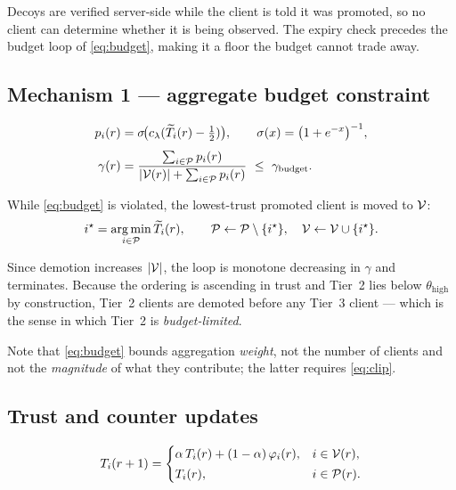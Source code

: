 Decoys are verified server-side while the client is told it was promoted, so no
client can determine whether it is being observed. The expiry check precedes
the budget loop of \eqref{eq:budget}, making it a floor the budget cannot trade
away.

\subsection{Mechanism 1 --- aggregate budget constraint}

\begin{align}
p_i(r) &= \sigma\!\bigl(c_\lambda (\widetilde{T}_i(r) - \tfrac{1}{2})\bigr),
\qquad \sigma(x)=\bigl(1+e^{-x}\bigr)^{-1},
\label{eq:posterior}\\[4pt]
\gamma(r) &= \frac{\sum_{i \in \mathcal{P}} p_i(r)}
                       {\lvert \mathcal{V}(r)\rvert + \sum_{i \in \mathcal{P}} p_i(r)}
\ \le\ \gamma_{\mathrm{budget}}.
\label{eq:budget}
\end{align}

While \eqref{eq:budget} is violated, the lowest-trust promoted client is moved
to $\mathcal{V}$:
\begin{equation}
i^\star = \operatorname*{arg\,min}_{i \in \mathcal{P}} \widetilde{T}_i(r),
\qquad
\mathcal{P} \leftarrow \mathcal{P} \setminus \{i^\star\},
\quad
\mathcal{V} \leftarrow \mathcal{V} \cup \{i^\star\}.
\label{eq:demote}
\end{equation}

Since demotion increases $\lvert\mathcal{V}\rvert$, the loop is monotone decreasing in
$\gamma$ and terminates. Because the ordering is ascending in trust and Tier~2
lies below $\theta_{\mathrm{high}}$ by construction, Tier~2 clients are demoted
before any Tier~3 client --- which is the sense in which Tier~2 is
\emph{budget-limited}.

Note that \eqref{eq:budget} bounds aggregation \emph{weight}, not the number of
clients and not the \emph{magnitude} of what they contribute; the latter
requires \eqref{eq:clip}.

\subsection{Trust and counter updates}

\begin{equation}
T_i(r+1)=
\begin{cases}
\alpha\, T_i(r) + (1-\alpha)\,\varphi_i(r), & i \in \mathcal{V}(r),\\[2pt]
T_i(r), & i \in \mathcal{P}(r).
\end{cases}
\label{eq:trust}
\end{equation}

